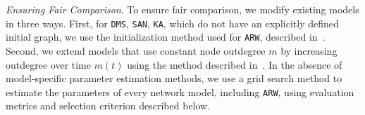 
\textit{Ensuring Fair Comparison}. To ensure fair comparison, we modify existing models in three ways.
First, for \texttt{DMS}, \texttt{SAN}, \texttt{KA}, which do not have an explicitly defined initial graph,
we use the initialization method used for \texttt{ARW}, described in~. Second, we extend
models that use constant node outdegree $m$ by increasing outdegree over time $m(t)$
using the method described in~. In the absence of model-specific parameter estimation methods,
we use a grid search method to estimate the parameters of every network model, including \texttt{ARW},
using evaluation metrics and selection criterion described below.

